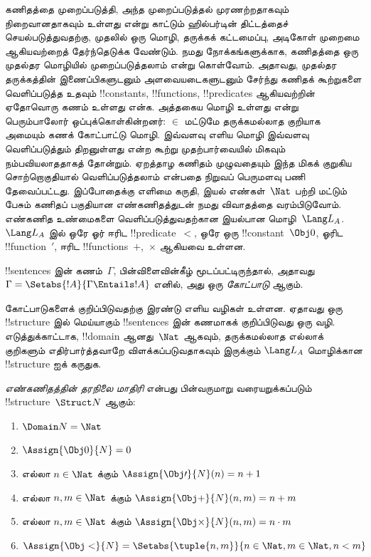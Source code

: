 \documentclass[../../../include/open-logic-section]{subfiles}
\begin{document}



கணிதத்தை முறைப்படுத்தி, அந்த முறைப்படுத்தல் முரணற்றதாகவும் நிறைவானதாகவும்
உள்ளது என்று காட்டும் ஹில்பர்டின் திட்டத்தைச் செயல்படுத்துவதற்கு, முதலில் ஒரு
மொழி, தருக்கக் கட்டமைப்பு, அடிகோள் முறைமை ஆகியவற்றைத் தேர்ந்தெடுக்க வேண்டும்.
நமது நோக்கங்களுக்காக, கணிதத்தை ஒரு முதல்தர மொழியில் முறைப்படுத்தலாம் என்று
கொள்வோம். அதாவது, முதல்தர தருக்கத்தின் இணைப்பிகளுடனும் அளவையடைகளுடனும்
சேர்ந்து கணிதக் கூற்றுகளை வெளிப்படுத்த உதவும் !!{constant}s,
!!{function}s, !!{predicate}s ஆகியவற்றின் ஏதோவொரு கணம் உள்ளது என்க.
அத்தகைய மொழி உள்ளது என்று பெரும்பாலோர் ஒப்புக்கொள்கின்றனர்: $\in$ மட்டுமே
தருக்கமல்லாத குறியாக அமையும் கணக் கோட்பாட்டு மொழி. இவ்வளவு எளிய மொழி
இவ்வளவு வெளிப்படுத்தும் திறனுள்ளது என்ற கூற்று முதற்பார்வையில் மிகவும்
நம்பவியலாததாகத் தோன்றும். ஏறத்தாழ கணிதம் முழுவதையும் இந்த மிகக் குறுகிய
சொற்றொகுதியால் வெளிப்படுத்தலாம் என்பதை நிறுவப் பெருமளவு பணி தேவைப்பட்டது.
இப்போதைக்கு எளிமை கருதி, இயல் எண்கள்~$\Nat$ பற்றி மட்டும் பேசும் கணிதப்
பகுதியான எண்கணிதத்துடன் நமது விவாதத்தை வரம்பிடுவோம். எண்கணித உண்மைகளை
வெளிப்படுத்துவதற்கான இயல்பான மொழி~$\Lang L_A$. $\Lang L_A$ இல் ஒரே ஓர்
ஈரிட !!{predicate}~$<$, ஒரே ஒரு !!{constant}~$\Obj 0$, ஓரிட
!!{function}~$\prime$, ஈரிட !!{function}s~$+$,~$\times$ ஆகியவை உள்ளன.

\begin{defn}
!!{sentence}s இன் கணம்~$\Gamma$, பின்விளைவின்கீழ் மூடப்பட்டிருந்தால்,
அதாவது $\Gamma = \Setabs{!A}{\Gamma \Entails !A}$ எனில், அது ஒரு
\emph{கோட்பாடு} ஆகும்.
\end{defn}

கோட்பாடுகளைக் குறிப்பிடுவதற்கு இரண்டு எளிய வழிகள் உள்ளன. ஏதாவது ஒரு
!!{structure} இல் மெய்யாகும் !!{sentence}s இன் கணமாகக் குறிப்பிடுவது
ஒரு வழி. எடுத்துக்காட்டாக, !!{domain} ஆனது~$\Nat$ ஆகவும், தருக்கமல்லாத
எல்லாக் குறிகளும் எதிர்பார்த்தவாறே விளக்கப்படுவதாகவும் இருக்கும்
$\Lang L_A$ மொழிக்கான !!{structure} ஐக் கருதுக.

\begin{defn}
\emph{எண்கணிதத்தின் தரநிலை மாதிரி} என்பது பின்வருமாறு வரையறுக்கப்படும்
!!{structure}~$\Struct N$ ஆகும்:
\begin{enumerate}
\item $\Domain N = \Nat$
\item $\Assign{\Obj 0}{N} = 0$
\item எல்லா $n \in \Nat$ க்கும் $\Assign{\Obj \prime}{N}(n) = n + 1$
\item எல்லா $n, m \in \Nat$ க்கும் $\Assign{\Obj +}{N}(n, m) = n + m$
\item எல்லா $n, m \in \Nat$ க்கும் $\Assign{\Obj \times}{N}(n, m) = n\cdot m$
\item $\Assign{\Obj <}{N} = \Setabs{\tuple{n, m}}{n \in \Nat, m \in
  \Nat, n < m}$
\end{enumerate}
\end{defn}
\end{document}

